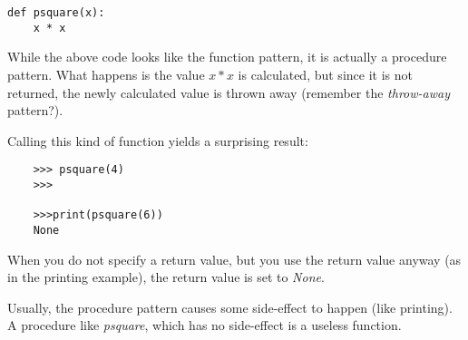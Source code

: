 \begin{verbatim}
def psquare(x):
    x * x
\end{verbatim}

While the above code looks like the function pattern, it is actually
a procedure pattern. What happens is the value $x * x$ is calculated,
but since it is not returned, the newly calculated value is thrown
away (remember the {\it throw-away} pattern?).

Calling this kind of function yields a surprising result:

\begin{verbatim}
    >>> psquare(4)
    >>>

    >>>print(psquare(6))
    None
\end{verbatim}

When you do not specify a return value, but you use
the return value anyway (as in the printing example),
the return value is set to {\it None}.

Usually, the procedure pattern causes some side-effect to happen
(like printing). A procedure like {\it psquare}, which has no side-effect
is a useless function.
